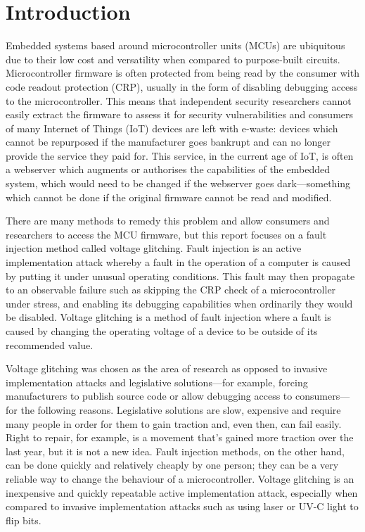 \newpage
\tableofcontents

\hypertarget{introduction}{%
\section{Introduction}\label{introduction}}

Embedded systems based around microcontroller units (MCUs) are
ubiquitous due to their low cost and versatility when compared to
purpose-built circuits. Microcontroller firmware is often protected from
being read by the consumer with code readout protection (CRP), usually
in the form of disabling debugging access to the microcontroller. This
means that independent security researchers cannot easily extract the
firmware to assess it for security vulnerabilities and consumers of many
Internet of Things (IoT) devices are left with e-waste: devices which
cannot be repurposed if the manufacturer goes bankrupt and can no longer
provide the service they paid for. This service, in the current age of
IoT, is often a webserver which augments or authorises the capabilities
of the embedded system, which would need to be changed if the webserver
goes dark---something which cannot be done if the original firmware
cannot be read and modified.

There are many methods to remedy this problem and allow consumers and
researchers to access the MCU firmware, but this report focuses on a
fault injection method called voltage glitching. Fault injection is an
active implementation attack whereby a fault in the operation of a
computer is caused by putting it under unusual operating conditions.
This fault may then propagate to an observable failure such as skipping
the CRP check of a microcontroller under stress, and enabling its
debugging capabilities when ordinarily they would be disabled. Voltage
glitching is a method of fault injection where a fault is caused by
changing the operating voltage of a device to be outside of its
recommended value.

Voltage glitching was chosen as the area of research as opposed to
invasive implementation attacks and legislative solutions---for example,
forcing manufacturers to publish source code or allow debugging access
to consumers---for the following reasons. Legislative solutions are
slow, expensive and require many people in order for them to gain
traction and, even then, can fail easily. Right to repair, for example,
is a movement that's gained more traction over the last year, but it is
not a new idea. Fault injection methods, on the other hand, can be done
quickly and relatively cheaply by one person; they can be a very
reliable way to change the behaviour of a microcontroller. Voltage
glitching is an inexpensive and quickly repeatable active implementation
attack, especially when compared to invasive implementation attacks such
as using laser or UV-C light to flip bits.

